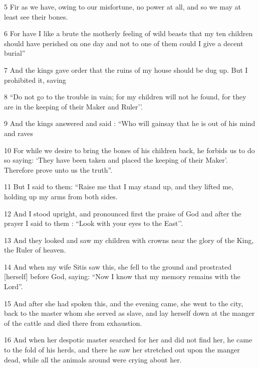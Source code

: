 \par 5 Fir as we have, owing to our misfortune, no power at all, and so we may at least see their bones.

\par 6 For have I like a brute the motherly feeling of wild beasts that my ten children should have perished on one day and not to one of them could I give a decent burial”

\par 7 And the kings gave order that the ruins of my house should be dug up. But I prohibited it, saving

\par 8 “Do not go to the trouble in vain; for my children will not he found, for they are in the keeping of their Maker and Ruler’’.

\par 9 And the kings answered and said : “Who will gainsay that he is out of his mind and raves

\par 10 For while we desire to bring the bones of his children back, he forbids us to do so saying: ‘They have been taken and placed the keeping of their Maker’. Therefore prove unto us the truth”.

\par 11 But I said to them: “Raise me that I may stand up, and they lifted me, holding up my arms from both sides.

\par 12 And I stood upright, and pronounced first the praise of God and after the prayer I said to them : “Look with your eyes to the East’’.

\par 13 And they looked and saw my children with crowns near the glory of the King, the Ruler of heaven.

\par 14 And when my wife Sitis saw this, she fell to the ground and prostrated [herself] before God, saying: “Now I know that my memory remains with the Lord”.

\par 15 And after she had spoken this, and the evening came, she went to the city, back to the master whom she served as slave, and lay herself down at the manger of the cattle and died there from exhaustion.

\par 16 And when her despotic master searched for her and did not find her, he came to the fold of his herds, and there he saw her stretched out upon the manger dead, while all the animals around were crying about her.

